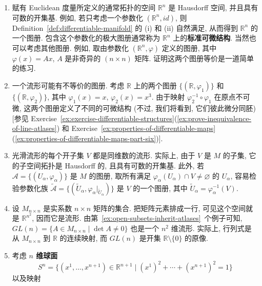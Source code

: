 \begin{RiemannExample}\label{ex:examples-of-differentiable-structures}
\begin{enumerate}[label=(\arabic*),ref=\arabic*,leftmargin=*]
\item\label{ex:standard-atlas-on-euclidean-space} 赋有 Euclidean 度量所定义的通常拓扑的空间 $\mathbb{R}^n$ 是 Hausdorff 空间, 并且具有可数的开集基. 例如, 若只考虑一个参数化 $(\mathbb{R}^n,id)$, 则 Definition~\ref{def:differentiable-manifold} 的 (i) 和 (ii) 自然满足, 从而得到 $\mathbb{R}^n$ 的一个图册. 包含这个参数化的极大图册通常称为 $\mathbb{R}^n$ 上的\textbf{标准可微结构}. 当然也可以考虑其他图册. 例如, 取由参数化 $(\mathbb{R}^n,\varphi)$ 定义的图册, 其中 $\varphi(x)=Ax$, $A$ 是非奇异的 $(n\times n)$ 矩阵. 证明这两个图册等价是一道简单的练习.
\item\label{ex:inequivalent-atlases-on-the-line} 一个流形可能有不等价的图册. 考虑 $\mathbb{R}$ 上的两个图册 $\{(\mathbb{R},\varphi_1)\}$ 和 $\{(\mathbb{R},\varphi_2)\}$, 其中 $\varphi_1(x)=x$, $\varphi_2(x)=x^3$. 由于映射 $\varphi_2^{-1}\circ\varphi_1$ 在原点不可微, 这两个图册定义了不同的可微结构 (不过, 我们将看到, 它们彼此微分同胚) [参见 Exercise~\ref{ex:exercise-differentiable-structures}(\ref{ex:prove-inequivalence-of-line-atlases}) 和 Exercise~\ref{ex:properties-of-differentiable-maps}(\ref{ex:properties-of-differentiable-maps-part-six})].
\item\label{ex:open-subsets-inherit-atlases} 光滑流形的每个开子集 $V$ 都是同维数的流形. 实际上, 由于 $V$ 是 $M$ 的子集, 它的子空间拓扑是 Hausdorff 的, 且具有可数的开集基. 此外, 若 $\mathcal{A}=\{(U_\alpha,\varphi_\alpha)\}$ 是 $M$ 的图册, 取所有满足 $\varphi_\alpha(U_\alpha)\cap V\ne\varnothing$ 的 $U_\alpha$, 容易检验参数化族 $\widetilde{\mathcal{A}}=\{(\widetilde U_\alpha,\varphi_\alpha|_{\widetilde U_\alpha})\}$ 是 $V$ 的一个图册, 其中 $\widetilde U_\alpha=\varphi_\alpha^{-1}(V)$.
\item\label{ex:matrix-space-and-general-linear-group} 设 $M_{n\times n}$ 是实系数 $n\times n$ 矩阵的集合. 把矩阵元素排成一行, 可见这个空间就是 $\mathbb{R}^{n^2}$, 因而它是流形. 由第~\ref{ex:open-subsets-inherit-atlases}~个例子可知, $GL(n)=\{A\in M_{n\times n}\mid\det A\ne 0\}$ 也是一个 $n^2$ 维流形. 实际上, 行列式是从 $M_{n\times n}$ 到 $\mathbb{R}$ 的连续映射, 而 $GL(n)$ 是开集 $\mathbb{R}\setminus\{0\}$ 的原像.
\item\label{ex:sphere-atlas-by-coordinate-projections} 考虑 \textbf{$n$ 维球面}
\[
  S^n=\{(x^1,\ldots,x^{n+1})\in\mathbb{R}^{n+1}\mid(x^1)^2+\cdots+(x^{n+1})^2=1\}
\]
以及映射
\[
  \begin{aligned}

\end{aligned}\]
\end{enumerate}
\end{RiemannExample}

